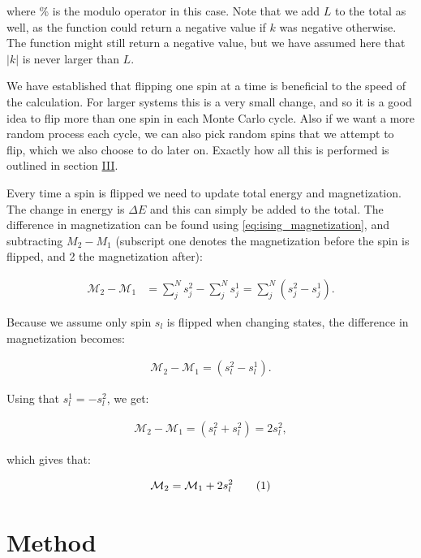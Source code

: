 \documentclass[reprint,english,notitlepage]{revtex4-1}  %
\newcommand\numberthis{\addtocounter{equation}{1}\tag{\theequation}}
\begin{document}
where \% is the modulo operator in this case. Note that we add $L$ to the total as well, as the function could return a negative value if $k$ was negative otherwise. The function might still return a negative value, but we have assumed here that $|k|$ is never larger than $L$. 
 
We have established that flipping one spin at a time is beneficial to the speed of the calculation. For larger systems this is a very small change, and so it is a good idea to flip more than one spin in each Monte Carlo cycle. Also if we want a more random process each cycle, we can also pick random spins that we attempt to flip, which we also choose to do later on. Exactly how all this is performed is outlined in section \hyperref[sec:III]{III}.

Every time a spin is flipped we need to update total energy and magnetization. The change in energy is $\Delta E$ and this can simply be added to the total. The difference in magnetization can be found using \eqref{eq:ising_magnetization}, and subtracting \(M_{2} - M_{1}\) (subscript one denotes the magnetization before the spin is flipped, and 2 the magnetization after): 

\begin{align*}
	\mathcal{M}_2 - \mathcal{M}_{1} &= \sum\limits_j^N s_j^{2} - \sum\limits_j^N s_j^{1} =
	\sum\limits_{j}^{N}\left(s_{j}^{2} - s_{j}^{1}\right).
\end{align*}

Because we assume only spin \(s_{l}\) is flipped when changing states, the difference in magnetization becomes:

\begin{align*}
 	\mathcal{M}_2 - \mathcal{M}_{1} = \left(s_{l}^{2} - s_{l}^{1}\right).
\end{align*} 

Using that \(s_{l}^{1} = - s_{l}^{2}\), we get:

\begin{align*}
	\mathcal{M}_2 - \mathcal{M}_{1} = \left(s_{l}^{2} + s_{l}^{2}\right) = 2s_{l}^{2},
\end{align*}

which gives that:

\begin{align*}
	\mathcal{M}_2 = \mathcal{M}_1 + 2s_{l}^{2} \numberthis \label{eq:delta_m}
\end{align*}


\newpage

\section{Method} \label{sec:III}
\end{document}
